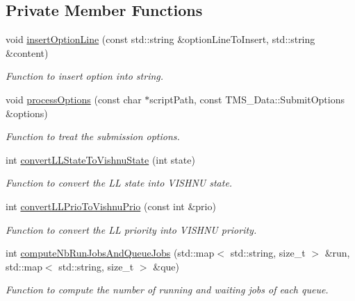 \subsection*{Private Member Functions}
\begin{DoxyCompactItemize}
\item 
void \hyperlink{classLLServer_a12ec697d6b846611c1e67ac1057d4ee0}{insertOptionLine} (const std::string \&optionLineToInsert, std::string \&content)
\begin{DoxyCompactList}\small\item\em Function to insert option into string. \item\end{DoxyCompactList}\item 
void \hyperlink{classLLServer_a54487bfb5d744a3b892e22127f3643ea}{processOptions} (const char $\ast$scriptPath, const TMS\_\-Data::SubmitOptions \&options)
\begin{DoxyCompactList}\small\item\em Function to treat the submission options. \item\end{DoxyCompactList}\item 
int \hyperlink{classLLServer_a0691e56eda4540ad4379a60ce1e5f3f5}{convertLLStateToVishnuState} (int state)
\begin{DoxyCompactList}\small\item\em Function to convert the LL state into VISHNU state. \item\end{DoxyCompactList}\item 
int \hyperlink{classLLServer_a8649f7c42ad24f66215a63d12e2d54a6}{convertLLPrioToVishnuPrio} (const int \&prio)
\begin{DoxyCompactList}\small\item\em Function to convert the LL priority into VISHNU priority. \item\end{DoxyCompactList}\item 
int \hyperlink{classLLServer_a3a9587a14a7cfb5e308b0f8173649cf9}{computeNbRunJobsAndQueueJobs} (std::map$<$ std::string, size\_\-t $>$ \&run, std::map$<$ std::string, size\_\-t $>$ \&que)
\begin{DoxyCompactList}\small\item\em Function to compute the number of running and waiting jobs of each queue. \item\end{DoxyCompactList}\item 

\end{DoxyCompactItemize}
